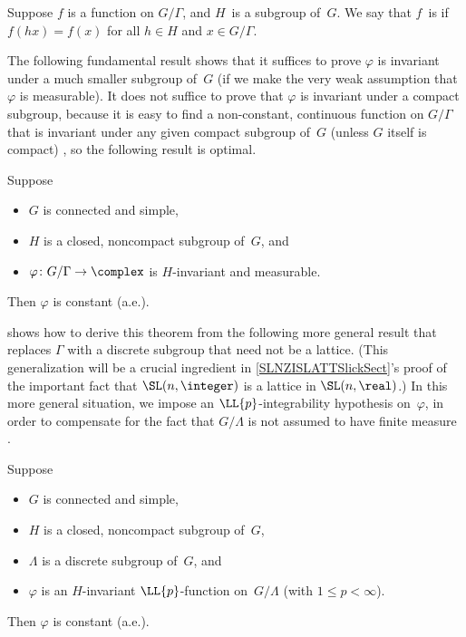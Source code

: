 \begin{defn}
Suppose $f$ is a function on $G/\Gamma$, and $H$~is a subgroup of~$G$. We say that $f$~is  if $f(hx) = f(x)$ for all $h \in H$ and $x \in G/\Gamma$.
\end{defn}

The following fundamental result shows that it suffices to prove $\varphi $ is invariant under a much smaller subgroup of~$G$ (if we make the very weak assumption that $\varphi$ is measurable). 
It does not suffice to prove that $\varphi $ is invariant under a compact subgroup, because it is easy to find a non-constant, continuous function on $G/\Gamma$ that is invariant under any given compact subgroup of~$G$ (unless $G$ itself is compact) , so the following result is optimal.


\begin{thm} \label{MooreErgThmGsimple}
Suppose
\noprelistbreak
	\begin{itemize}
	\item $G$ is connected and simple,
	\item $H$ is a closed, noncompact subgroup of~$G$,
	and
	\item $\varphi \colon G/\Gamma \to \complex$ is $H$-invariant and measurable.
	\end{itemize}
Then $\varphi$ is constant \textup(a.e.\textup).
\end{thm}


 shows how to derive this theorem from the following more general result that replaces $\Gamma$ with a discrete subgroup that need not be a lattice. (This generalization will be a crucial ingredient in \cref{SLNZISLATTSlickSect}'s proof of the important fact that $\SL(n,\integer)$ is a lattice in $\SL(n,\real)$.) In this more general situation, we impose an $\LL{p}$-integrability hypothesis on~$\varphi$, in order to compensate for the fact that $G/\Lambda$ is not assumed to have finite measure .

\begin{thm} \label{MooreErgBasicThm}
Suppose
\noprelistbreak
	\begin{itemize}
	\item $G$ is connected and simple,
	\item $H$ is a closed, noncompact subgroup of~$G$,
	\item $\Lambda$ is a discrete subgroup of~$G$,
	and
	\item $\varphi$ is an $H$-invariant $\LL{p}$-function on~$G/\Lambda$ \textup(with $1 \le p < \infty$\textup).
	\end{itemize}
Then $\varphi$ is constant \textup(a.e.\textup).
\end{thm}

